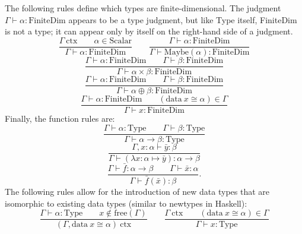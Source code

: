 \documentclass[11pt]{article}
\begin{document}
The following rules define which types are finite-dimensional.
The judgment $\Gamma \vdash \alpha : \text{FiniteDim}$ appears to be
a type judgment, but like Type itself, FiniteDim is not a type; it can appear only
by itself on the right-hand side of a judgment.
\begin{equation}
	\frac{\Gamma\ \text{ctx}
	\qquad \alpha \in \text{Scalar}}
	{\Gamma \vdash \alpha : \text{FiniteDim}}
	\qquad
	\frac{\Gamma \vdash \alpha : \text{FiniteDim}}
	{\Gamma \vdash \text{Maybe}(\alpha) : \text{FiniteDim}}
\end{equation}
\begin{equation}
	\frac{\Gamma \vdash \alpha : \text{FiniteDim}
	\qquad \Gamma \vdash \beta : \text{FiniteDim}}
	{\Gamma \vdash \alpha \times \beta : \text{FiniteDim}}
\end{equation}
\begin{equation}
	\frac{\Gamma \vdash \alpha : \text{FiniteDim}
	\qquad \Gamma \vdash \beta : \text{FiniteDim}}
	{\Gamma \vdash \alpha \oplus \beta : \text{FiniteDim}}
\end{equation}
\begin{equation}
	\frac{\Gamma \vdash \alpha : \text{FiniteDim}
	\qquad (\text{data}\ x \cong \alpha) \in \Gamma}
	{\Gamma \vdash x : \text{FiniteDim}}
\end{equation}
Finally, the function rules are:
\begin{equation}
	\frac{\Gamma \vdash \alpha : \text{Type}
	\qquad \Gamma \vdash \beta : \text{Type}}
	{\Gamma \vdash \alpha \to \beta : \text{Type}}
\end{equation}
\begin{equation}
	\frac{\Gamma, x : \alpha \vdash \bar{y} : \beta}
	{\Gamma \vdash (\lambda x : \alpha \mapsto \bar{y}) : \alpha \to \beta}
\end{equation}
\begin{equation}
	\frac{\Gamma \vdash \bar{f} : \alpha \to \beta
	\qquad \Gamma \vdash \bar{x} : \alpha}
	{\Gamma \vdash \bar{f}(\bar{x}) : \beta}.
\end{equation}
The following rules allow for the introduction of new data types
that are isomorphic to existing data types (similar to newtypes
in Haskell):
\begin{equation}
	\frac{\Gamma \vdash \alpha : \text{Type}
	\qquad x \notin \text{free}(\Gamma)}
	{(\Gamma, \text{data}\ x \cong \alpha)\ \text{ctx}}
	\qquad
	\frac{\Gamma\ \text{ctx}
		\qquad (\text{data}\ x \cong \alpha) \in \Gamma}
		{\Gamma \vdash x : \text{Type}}
\end{equation}
\end{document}
